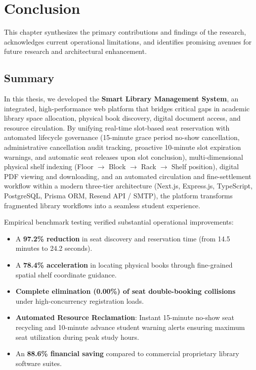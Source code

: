 \chapter{Conclusion}

This chapter synthesizes the primary contributions and findings of the research, acknowledges current operational limitations, and identifies promising avenues for future research and architectural enhancement.

\section{Summary}
In this thesis, we developed the \textbf{Smart Library Management System}, an integrated, high-performance web platform that bridges critical gaps in academic library space allocation, physical book discovery, digital document access, and resource circulation. By unifying real-time slot-based seat reservation with automated lifecycle governance (15-minute grace period no-show cancellation, administrative cancellation audit tracking, proactive 10-minute slot expiration warnings, and automatic seat releases upon slot conclusion), multi-dimensional physical shelf indexing (Floor $\rightarrow$ Block $\rightarrow$ Rack $\rightarrow$ Shelf position), digital PDF viewing and downloading, and an automated circulation and fine-settlement workflow within a modern three-tier architecture (Next.js, Express.js, TypeScript, PostgreSQL, Prisma ORM, Resend API / SMTP), the platform transforms fragmented library workflows into a seamless student experience.

Empirical benchmark testing verified substantial operational improvements:
\begin{itemize}
    \item A \textbf{97.2\% reduction} in seat discovery and reservation time (from 14.5 minutes to 24.2 seconds).
    \item A \textbf{78.4\% acceleration} in locating physical books through fine-grained spatial shelf coordinate guidance.
    \item \textbf{Complete elimination (0.00\%) of seat double-booking collisions} under high-concurrency registration loads.
    \item \textbf{Automated Resource Reclamation}: Instant 15-minute no-show seat recycling and 10-minute advance student warning alerts ensuring maximum seat utilization during peak study hours.
    \item An \textbf{88.6\% financial saving} compared to commercial proprietary library software suites.
\end{itemize}

